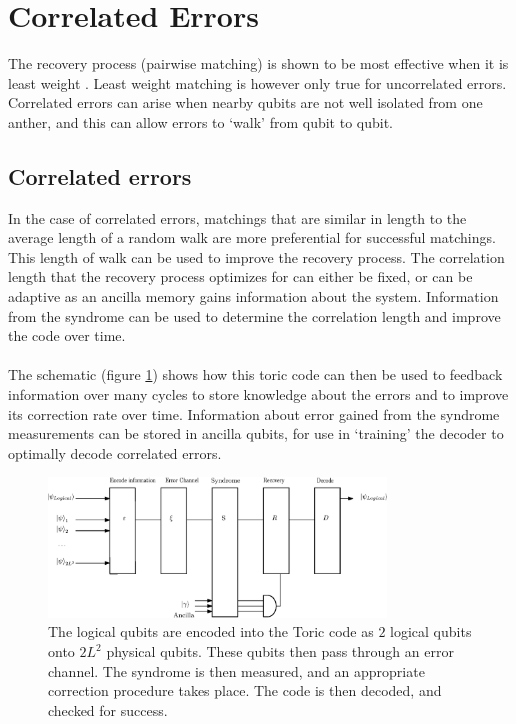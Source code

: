\section{Correlated Errors}
	The recovery process (pairwise matching) is shown to be most effective when it is least weight \cite{Dennis2001}. Least weight matching is however only true for uncorrelated errors.
	Correlated errors can arise when nearby qubits are not well isolated from one anther, and this can allow errors to `walk' from qubit to qubit.

 	\subsection{Correlated errors}

	In the case of correlated errors, matchings that are similar in length to the average length of a random walk are more preferential for successful matchings. This length of walk can be used to improve the recovery process. The correlation length that the recovery process optimizes for can either be fixed, or can be adaptive as an ancilla memory gains information about the system. Information from the syndrome can be used to determine the correlation length and improve the code over time. 
	\\\\
	The schematic (figure \ref{fig:schematic}) shows how this toric code can then be used to feedback information over many cycles to store knowledge about the errors and to improve its correction rate over time. Information about error gained from the syndrome measurements can be stored in ancilla qubits, for use in `training' the decoder to optimally decode correlated errors.
	
	\begin{figure}[htpb]
	\centering
	\includegraphics[width =0.8\textwidth]{figs/schematic.eps}
	\caption{The logical qubits are encoded into the Toric code as $2$ logical qubits onto $2L^2$ physical qubits. These qubits then pass through an error channel. The syndrome is then measured, and an appropriate correction procedure takes place. The code is then decoded, and checked for success. }
	\label{fig:schematic}
	\end{figure}


